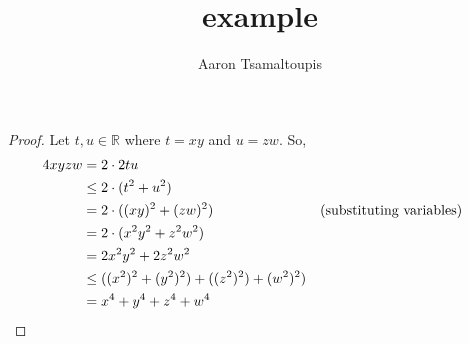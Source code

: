 \documentclass[12pt, letterpaper]{article}
\title{example}
\author{Aaron Tsamaltoupis}
\newtheorem{proof}{Proof}[theorem]
\begin{document}
\maketitle
\tableofcontents
\newpage


\begin{proof}
  Let $t,u \in \mathbb{R}$ where $t=xy$ and $u=zw$. So,
  \begin{align*}
    4xyzw &= 2\cdot2tu \\
    &\le 2\cdot(t^2+u^2) \\
    &= 2\cdot((xy)^2+(zw)^2) &&\text{(substituting variables)} \\
    &= 2\cdot(x^2y^2+z^2w^2) \\ 
    &= 2x^2y^2+2z^2w^2 \\
    &\le ((x^2)^2+(y^2)^2)+((z^2)^2)+(w^2)^2) \\
    &= x^4+y^4+z^4+w^4 &&\qedhere
  \end{align*}
\end{proof}
\end{document}
